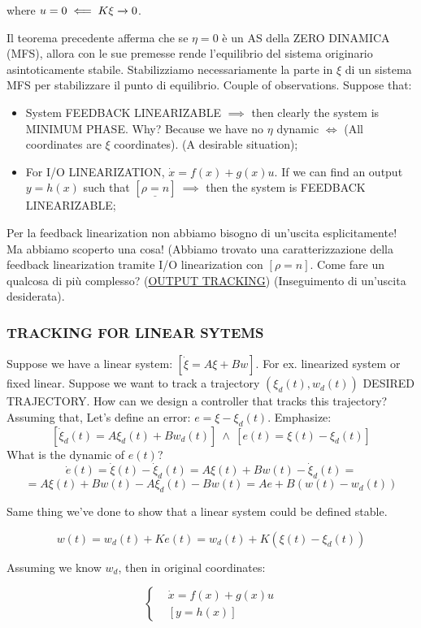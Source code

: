 where $u = 0 \impliedby K\xi \tendsto{} 0$. 

Il teorema precedente afferma che se $\eta = 0$ è un AS della ZERO DINAMICA (MFS), allora con le sue premesse rende l'equilibrio del sistema originario asintoticamente stabile. Stabilizziamo necessariamente la parte in $\xi$ di un sistema MFS per stabilizzare il punto di equilibrio. Couple of observations. Suppose that:
\begin{itemize}
\item System FEEDBACK LINEARIZABLE $\implies$ then clearly the system is MINIMUM PHASE. Why? Because we have no $\eta$ dynamic $\iff$ (All coordinates are $\xi$ coordinates). (A desirable situation);
\item For I/O LINEARIZATION, $\dot{x}=f(x)+g(x)u$. If we can find an output $y=h(x)$ such that $[\underline{\rho = n}]\ \implies$ then the system is FEEDBACK LINEARIZABLE;
\end{itemize}
Per la feedback linearization non abbiamo bisogno di un'uscita esplicitamente! Ma abbiamo scoperto una cosa! (Abbiamo trovato una caratterizzazione della feedback linearization tramite I/O linearization con $[\rho = n]$.
Come fare un qualcosa di più complesso? (\underline{OUTPUT TRACKING}) (Inseguimento di un'uscita desiderata).

\subsubsection{TRACKING FOR LINEAR SYTEMS}

Suppose we have a linear system: $[\dot{\xi} = A\xi + Bw]$. For ex. linearized system or fixed linear. Suppose we want to track a trajectory $(\xi_d(t),w_d(t))$ DESIRED TRAJECTORY. How can we design a controller that tracks this trajectory? Assuming that, Let's define an error: $e = \xi - \xi_d(t)$. Emphasize:
\[
	[\dot{\xi}_d(t) = A\xi_d(t) + Bw_d(t)]\ \land\ [e(t) = \xi(t) - \xi_d(t)]
\]
What is the dynamic of $e(t)$?
\[
	\dot{e}(t) = \dot{\xi}(t) - \dot{\xi}_d(t) = A\xi(t) +Bw(t) - \dot{\xi}_d(t) =
\]
\[
	= A\xi(t) + Bw(t) -A\xi_d(t) - Bw(t) = Ae + B(w(t) - w_d(t))
\] 

Same thing we've done to show that a linear system could be defined stable.

\[
	w(t) = w_d(t) + Ke(t) = w_d(t) + K(\xi(t) - \xi_d(t))
\]

Assuming we know $w_d$, then in original coordinates:

\[
	\left\{
	\begin{aligned}
	&\dot{x}=f(x)+g(x)u \\
	&[y=h(x)]
	\end{aligned}
	\right.
\]

